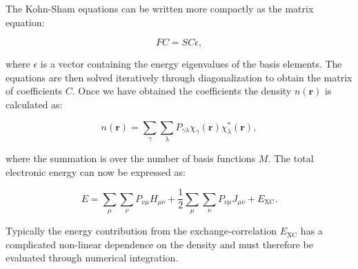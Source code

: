 The Kohn-Sham equations can be written more compactly as the matrix equation:

\begin{equation}
 FC = SC\epsilon , 
\end{equation}

where $\epsilon$ is a vector containing the energy eigenvalues
of the basis elements. The equations are then solved
iteratively through diagonalization to obtain
the matrix of coefficients $C$. Once we have obtained the 
coefficients the density $n(\bm{r})$ is calculated as:

\begin{equation}
 n(\bm{r}) = \sum_{\gamma} \sum_{\lambda} P_{\gamma\lambda}
    \chi_{\gamma}(\bm{r}) \chi_{\lambda}^*(\bm{r}) , 
\end{equation}

where the summation is over the number of basis functions $M$.
The total electronic energy can now be expressed
as:

\begin{equation}
E = \sum_{\mu} \sum_{\nu} P_{\nu\mu} H_{\mu\nu}
    +\frac{1}{2} \sum_{\mu} \sum_{\nu} P_{\nu\mu}
    J_{\mu\nu}
    + E_{\text{XC}} .
\end{equation}

Typically the energy contribution from the exchange-correlation
$E_{\text{XC}}$ has a complicated non-linear dependence on the
density and must therefore be evaluated through
numerical integration.
